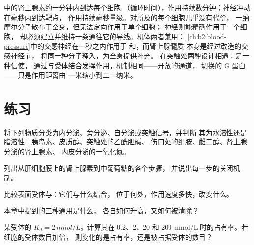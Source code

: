 \begin{example}\label{ex:b2:cell-signalling:compare}
中的肾上腺素约一分钟内到达每个细胞
（循环时间），作用持续数分钟；神经冲动在毫秒内到达靶点，
作用持续毫秒量级。对所及的每个细胞几乎没有代价，
一纳摩尔分子散布于全身，但无法定向作用于单个细胞；
神经则能精确作用于一个细胞，
却必须建立并维持一条通往它的导线。机体两者兼用：
\cref{ch:b2:blood-pressure}中的交感神经在一秒之内作用于
和，而肾上腺髓质
本身是经过改造的交感神经节，
将同一种分子释入，为全身提供补充。
在突触处两种设计相遇：是一种信使，
通过与受体结合发挥作用，机制相同——开放的通道，
切换的 G 蛋白——只是作用距离由
一米缩小到二十纳米。
\end{example}

\section{练习}

\begin{exercise}[$\star$]\label{exo:b2:cell-signalling:1}
将下列物质分类为内分泌、旁分泌、自分泌或突触信号，并判断
其为水溶性还是脂溶性：胰岛素、皮质醇、突触处的乙酰胆碱、
伤口处的组胺、雌二醇、肾上腺分泌的肾上腺素、
内皮分泌的一氧化氮。
\end{exercise}

\begin{exercise}[$\star$]\label{exo:b2:cell-signalling:2}
列出从肝细胞膜上的肾上腺素到中葡萄糖的各个步骤，
并说出每一步的关闭机制。
\end{exercise}

\begin{exercise}[$\star$]\label{exo:b2:cell-signalling:3}
比较表面受体与：它们与什么结合，
位于何处，作用速度多快，改变什么。
\end{exercise}

\begin{exercise}[$\star$]\label{exo:b2:cell-signalling:4}
本章中提到的三种通用是什么，
各自如何升高，又如何被清除？
\end{exercise}

\begin{exercise}[$\star\star$]\label{exo:b2:cell-signalling:5}
某受体的 $K_d = \qty{2}{nmol/L}$。计算其在
0.2、2、20 和 \qty{200}{nmol/L} 时的占有率。若细胞的受体数目加倍，
则变化的是占有率，还是被占据受体的数目？
\end{exercise}

